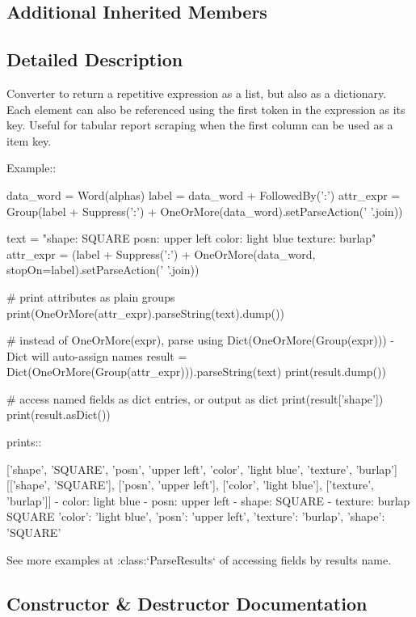 \subsection*{Additional Inherited Members}


\subsection{Detailed Description}
\begin{DoxyVerb}Converter to return a repetitive expression as a list, but also
as a dictionary. Each element can also be referenced using the first
token in the expression as its key. Useful for tabular report
scraping when the first column can be used as a item key.

Example::

    data_word = Word(alphas)
    label = data_word + FollowedBy(':')
    attr_expr = Group(label + Suppress(':') + OneOrMore(data_word).setParseAction(' '.join))

    text = "shape: SQUARE posn: upper left color: light blue texture: burlap"
    attr_expr = (label + Suppress(':') + OneOrMore(data_word, stopOn=label).setParseAction(' '.join))

    # print attributes as plain groups
    print(OneOrMore(attr_expr).parseString(text).dump())

    # instead of OneOrMore(expr), parse using Dict(OneOrMore(Group(expr))) - Dict will auto-assign names
    result = Dict(OneOrMore(Group(attr_expr))).parseString(text)
    print(result.dump())

    # access named fields as dict entries, or output as dict
    print(result['shape'])
    print(result.asDict())

prints::

    ['shape', 'SQUARE', 'posn', 'upper left', 'color', 'light blue', 'texture', 'burlap']
    [['shape', 'SQUARE'], ['posn', 'upper left'], ['color', 'light blue'], ['texture', 'burlap']]
    - color: light blue
    - posn: upper left
    - shape: SQUARE
    - texture: burlap
    SQUARE
    {'color': 'light blue', 'posn': 'upper left', 'texture': 'burlap', 'shape': 'SQUARE'}

See more examples at :class:`ParseResults` of accessing fields by results name.
\end{DoxyVerb}
 

\subsection{Constructor \& Destructor Documentation}
\mbox{\label{classpip_1_1__vendor_1_1pyparsing_1_1Dict_a2b75b1f00eed65e1e30c5f81096c5d1f}} 
